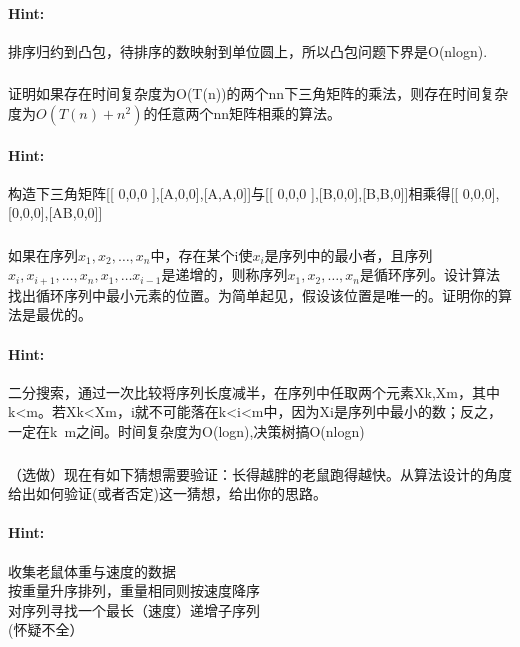 \documentclass{article}
\begin{document}
     \paragraph{Hint:}排序归约到凸包，待排序的数映射到单位圆上，所以凸包问题下界是O(nlogn).\\
     
     \subsubsection{}证明如果存在时间复杂度为O(T(n))的两个nn下三角矩阵的乘法，则存在时间复杂度为$O(T(n)+n^2)$的任意两个nn矩阵相乘的算法。
     \paragraph{Hint:}构造下三角矩阵[[ 0,0,0 ],[A,0,0],[A,A,0]]与[[ 0,0,0 ],[B,0,0],[B,B,0]]相乘得[[ 0,0,0],[0,0,0],[AB,0,0]]
     
     \subsubsection{}如果在序列$x_1,x_2,…,x_n$中，存在某个i使$x_i$是序列中的最小者，且序列$x_i,x_{i+1},…,x_n,x_1,…x_{i-1}$是递增的，则称序列$x_1,x_2,…,x_n$是循环序列。设计算法找出循环序列中最小元素的位置。为简单起见，假设该位置是唯一的。证明你的算法是最优的。
     \paragraph{Hint:}二分搜索，通过一次比较将序列长度减半，在序列中任取两个元素Xk,Xm，其中k<m。若Xk<Xm，i就不可能落在k<i<m中，因为Xi是序列中最小的数；反之，一定在k~m之间。时间复杂度为O(logn),决策树搞O(nlogn)\\
     
     \subsubsection{}（选做）现在有如下猜想需要验证：长得越胖的老鼠跑得越快。从算法设计的角度给出如何验证(或者否定)这一猜想，给出你的思路。
     \paragraph{Hint:}收集老鼠体重与速度的数据\\
     按重量升序排列，重量相同则按速度降序\\
     对序列寻找一个最长（速度）递增子序列\\
     (怀疑不全）\\
     
\end{document}
